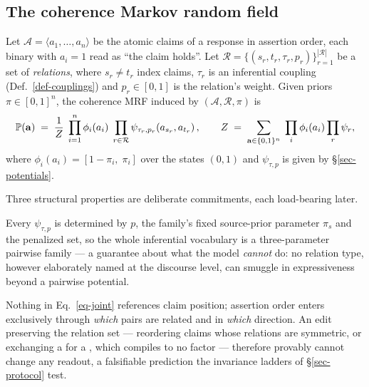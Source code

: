 \subsection{The coherence Markov random field}
\label{sec-mrf}

\begin{definition}
\label{def-mrf}
Let $\mathcal{A}=\langle a_1,\dots,a_n\rangle$ be the atomic claims of a response in assertion order,
each binary with $a_i=1$ read as ``the claim holds''. Let
$\mathcal{R}=\{(s_r,t_r,\tau_r,p_r)\}_{r=1}^{|\mathcal{R}|}$ be a set of \emph{relations}, where
$s_r\neq t_r$ index claims, $\tau_r$ is an inferential coupling (Def.~\ref{def-couplings}) and
$p_r\in[0,1]$ is the relation's weight. Given priors $\pi\in[0,1]^n$, the coherence MRF induced by
$(\mathcal{A},\mathcal{R},\pi)$ is
\begin{equation}
\mathbb{P}\!\left( \mathbf{a} \right) \;=\; \frac{1}{Z}\;
  \prod_{i=1}^{n}\phi_i(a_i)\;
  \prod_{r\in\mathcal{R}}\psi_{\tau_r,p_r}\!\left(a_{s_r},a_{t_r}\right),
\qquad
Z \;=\; \sum_{\mathbf{a}\in\{0,1\}^n}\;\prod_{i}\phi_i(a_i)\prod_{r}\psi_r ,
\label{eq-joint}
\end{equation}
where $\phi_i(a_i)=[1-\pi_i,\;\pi_i]$ over the states $(0,1)$ and $\psi_{\tau,p}$ is given by
\S\ref{sec-potentials}.
\end{definition}

Three structural properties are deliberate commitments, each load-bearing later.

\begin{remark}
\label{rem-closed}
Every $\psi_{\tau,p}$ is determined by $p$, the family's fixed source-prior parameter $\pi_s$ and the penalized set, so the whole
inferential vocabulary is a three-parameter pairwise family --- a guarantee about what the model \emph{cannot}
do: no relation type, however elaborately named at the discourse level, can smuggle in expressiveness beyond a
pairwise potential.
\end{remark}

\begin{remark}
\label{rem-order}
Nothing in Eq.~\ref{eq-joint} references claim position; assertion order enters exclusively through
\emph{which} pairs are related and in \emph{which} direction. An edit preserving the relation set ---
reordering claims whose relations are symmetric, or exchanging a  for a
, which compiles to no factor --- therefore provably cannot change any readout, a
falsifiable prediction the invariance ladders of \S\ref{sec-protocol} test.
\end{remark}

